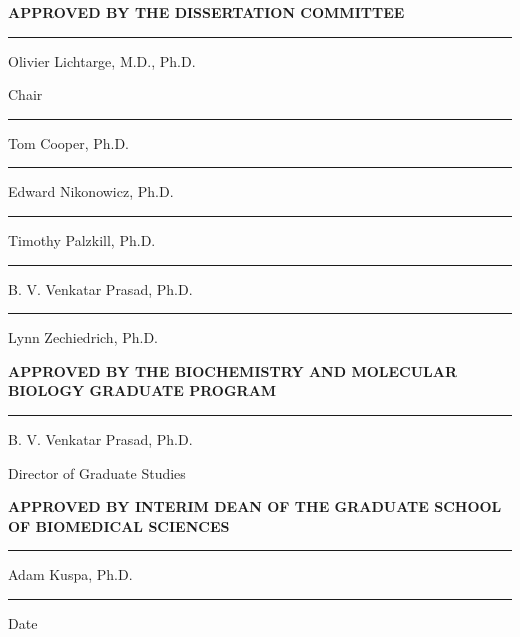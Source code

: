 \documentclass[12pt,a4paper]{report}
\begin{document}
\begin{center}
\begin{spacing}{1}

\vspace{5cm}
\MakeUppercase{\fontsize{12}{22}\selectfont \textbf{Approved by the dissertation committee}} \par
\vspace{1.5cm}
\thispagestyle{empty}
\rule{7cm}{1pt} \par
Olivier Lichtarge, M.D., Ph.D.\par
Chair\par
\vspace{0.5cm}
\rule{7cm}{1pt} \par
Tom Cooper, Ph.D.\par
\vspace{0.5cm}
\rule{7cm}{1pt} \par
Edward Nikonowicz, Ph.D.\par
\vspace{0.5cm}
\rule{7cm}{1pt} \par
Timothy Palzkill, Ph.D.\par
\vspace{0.5cm}
\rule{7cm}{1pt} \par
B. V. Venkatar Prasad, Ph.D.\par
\vspace{0.5cm}
 \rule{7cm}{1pt} \par
Lynn Zechiedrich, Ph.D.\par

\vspace{1.5cm}
\MakeUppercase{\fontsize{12}{22}\selectfont \textbf{APPROVED  BY THE BIOCHEMISTRY AND MOLECULAR BIOLOGY GRADUATE PROGRAM}} \par
 
\vspace{0.75cm}
\rule{7cm}{1pt} \par
B. V. Venkatar Prasad, Ph.D.\par
Director of Graduate Studies\par

\vspace{1.5cm}

\MakeUppercase{\fontsize{12}{22}\selectfont \textbf{APPROVED BY INTERIM DEAN OF THE GRADUATE SCHOOL OF BIOMEDICAL SCIENCES }} \par
\vspace{0.75cm}
 \rule{7cm}{1pt} \par
Adam Kuspa, Ph.D.\par
\vspace{0.5cm}
 \rule{7cm}{1pt} \par
 Date
\end{spacing}
\end{center}
\break
\end{document}
